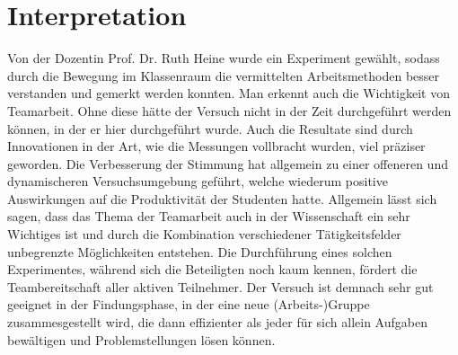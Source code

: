 \documentclass{article}
\begin{document}
\section{Interpretation}
Von der Dozentin Prof. Dr. Ruth Heine wurde ein Experiment gewählt, sodass durch die Bewegung im Klassenraum die vermittelten Arbeitsmethoden besser verstanden und gemerkt werden konnten. Man erkennt auch die Wichtigkeit von Teamarbeit. Ohne diese hätte der Versuch nicht in der Zeit durchgeführt werden können, in der er hier durchgeführt wurde. Auch die Resultate sind durch Innovationen in der Art, wie die Messungen vollbracht wurden, viel präziser geworden. Die Verbesserung der Stimmung hat allgemein zu einer offeneren und dynamischeren Versuchsumgebung geführt, welche wiederum positive Auswirkungen auf die Produktivität der Studenten hatte. Allgemein lässt sich sagen, dass das Thema der Teamarbeit auch in der Wissenschaft ein sehr Wichtiges ist und durch die Kombination verschiedener Tätigkeitsfelder unbegrenzte Möglichkeiten entstehen. Die Durchführung eines solchen Experimentes, während sich die Beteiligten noch kaum kennen, fördert die Teambereitschaft aller aktiven Teilnehmer. Der Versuch ist demnach sehr gut geeignet in der Findungsphase, in der eine neue (Arbeits-)Gruppe zusammesgestellt wird, die dann effizienter als jeder für sich allein Aufgaben bewältigen und Problemstellungen lösen können.
\end{document}
